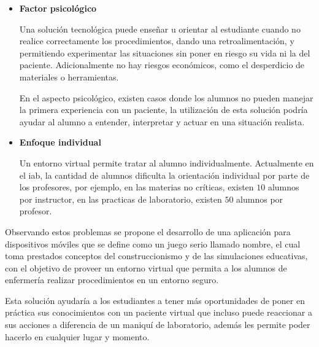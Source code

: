 \begin{itemize}
     

    
\item \textbf{Factor psicológico}

	Una solución tecnológica puede enseñar u orientar al estudiante cuando
    no realice correctamente los procedimientos, dando una retroalimentación, y
    permitiendo experimentar las situaciones sin poner en riesgo su
    vida ni la del paciente. Adicionalmente no hay riesgos económicos, como el
    desperdicio de materiales o herramientas.

    En el aspecto psicológico, existen casos donde los alumnos no
    pueden manejar la primera experiencia con un paciente, la utilización de
    esta solución podría ayudar 
    al alumno a entender, interpretar y actuar en una situación realista.   
%    
%
%    
%    
%    
%    
\item \textbf{Enfoque individual}

	Un entorno virtual permite tratar al alumno individualmente. 
	Actualmente en el \gls{iab}, la cantidad de alumnos dificulta la orientación 
	individual por parte de los
    profesores, por ejemplo, en las materias no críticas, existen $10$ alumnos
    por instructor, en las practicas de laboratorio, existen $50$ alumnos por
    profesor.

    

\end{itemize}


Observando estos problemas se propone el desarrollo de una aplicación para
dispositivos móviles que se define como un juego serio llamado \Gls{nombre}, el
cual toma prestados conceptos del construccionismo y de las simulaciones
educativas, con el objetivo de proveer un entorno virtual que permita a los
alumnos de enfermería realizar procedimientos en un entorno seguro.

Esta solución ayudaría a los estudiantes a tener más oportunidades de poner en
práctica sus conocimientos con un paciente virtual que incluso puede reaccionar
a sus acciones a diferencia de un maniquí de laboratorio, además les permite
poder hacerlo en cualquier lugar y momento.
